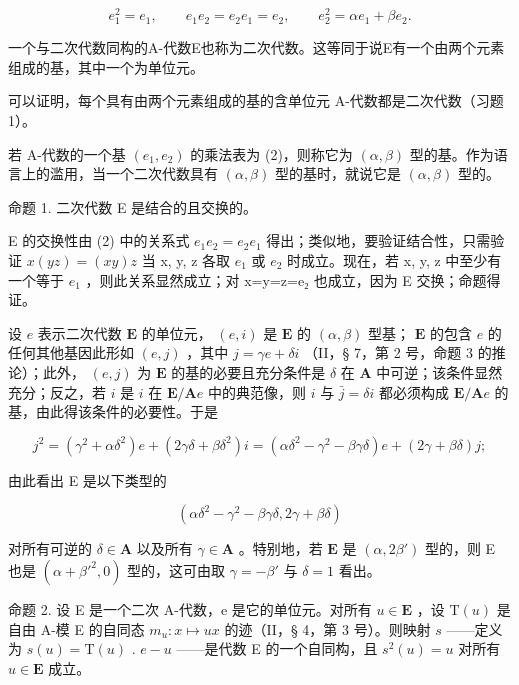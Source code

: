 \[
e _ {1} ^ {2} = e _ {1}, \qquad e _ {1} e _ {2} = e _ {2} e _ {1} = e _ {2}, \qquad e _ {2} ^ {2} = \alpha e _ {1} + \beta e _ {2}.\tag{2}
\]

一个与二次代数同构的A-代数E也称为二次代数。这等同于说E有一个由两个元素组成的基，其中一个为单位元。

可以证明，每个具有由两个元素组成的基的含单位元 A-代数都是二次代数（习题 1）。

若 A-代数的一个基 \((e_{1}, e_{2})\) 的乘法表为 (2)，则称它为 \((\alpha, \beta)\) 型的基。作为语言上的滥用，当一个二次代数具有 \((\alpha, \beta)\) 型的基时，就说它是 \((\alpha, \beta)\) 型的。

命题 1. 二次代数 E 是结合的且交换的。

E 的交换性由 (2) 中的关系式 \(e_{1}e_{2}=e_{2}e_{1}\) 得出；类似地，要验证结合性，只需验证 \(x(yz)=(xy)z\) 当 x, y, z 各取 \(e_{1}\) 或 \(e_{2}\) 时成立。现在，若 x, y, z 中至少有一个等于 \(e_{1}\) ，则此关系显然成立；对 x=y=z=e₂ 也成立，因为 E 交换；命题得证。

设 \(e\) 表示二次代数 \(\mathbf{E}\) 的单位元， \((e, i)\) 是 \(\mathbf{E}\) 的 \((\alpha, \beta)\) 型基； \(\mathbf{E}\) 的包含 \(e\) 的任何其他基因此形如 \((e, j)\) ，其中 \(j = \gamma e + \delta i\) （II，§ 7，第 2 号，命题 3 的推论）；此外， \((e, j)\) 为 \(\mathbf{E}\) 的基的必要且充分条件是 \(\delta\) 在 \(\mathbf{A}\) 中可逆；该条件显然充分；反之，若 \(i\) 是 \(i\) 在 \(\mathbf{E}/\mathbf{A}e\) 中的典范像，则 \(i\) 与 \(\bar{j} = \delta i\) 都必须构成 \(\mathbf{E}/\mathbf{A}e\) 的基，由此得该条件的必要性。于是

\[
j ^ {2} = (\gamma^ {2} + \alpha \delta^ {2}) e + (2 \gamma \delta + \beta \delta^ {2}) i = (\alpha \delta^ {2} - \gamma^ {2} - \beta \gamma \delta) e + (2 \gamma + \beta \delta) j;
\]

由此看出 E 是以下类型的

\[
(\alpha \delta^ {2} - \gamma^ {2} - \beta \gamma \delta , 2 \gamma + \beta \delta)\tag{3}
\]

对所有可逆的 \(\delta \in \mathbf{A}\) 以及所有 \(\gamma \in \mathbf{A}\) 。特别地，若 \(\mathbf{E}\) 是 \((\alpha, 2\beta')\) 型的，则 E 也是 \((\alpha + \beta'^2, 0)\) 型的，这可由取 \(\gamma = -\beta'\) 与 \(\delta = 1\) 看出。

命题 2. 设 E 是一个二次 A-代数，e 是它的单位元。对所有 \(u \in \mathbf{E}\) ，设 \(\mathrm{T}(u)\) 是自由 A-模 E 的自同态 \(m_u: x \mapsto ux\) 的迹（II，§ 4，第 3 号）。则映射 \(s\) ——定义为 \(s(u) = \mathrm{T}(u)\) . \(e - u\) ——是代数 E 的一个自同构，且 \(s^2(u) = u\) 对所有 \(u \in \mathbf{E}\) 成立。

